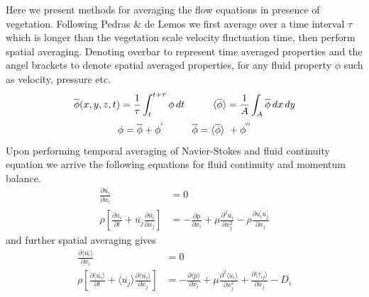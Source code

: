 \documentclass[12pt]{report}   %
\renewcommand{\bar}{\overline}
\begin{document}

Here we present methods for averaging the flow equations in presence of vegetation. Following Pedras $\&$ de Lemos \cite{Pedras00} we first average over a time interval $\tau$ which is longer than the vegetation scale velocity fluctuation time, then perform spatial averaging. Denoting 
overbar to represent time averaged properties and the angel brackets to denote spatial averaged properties, for any fluid property $\phi$ such as velocity, pressure etc.
  \[ \bar{\phi}(x,y,z,t) = \frac{1}{\tau} \int_{t}^{t+\tau} \phi  \, dt \hspace{1.cm}  \langle \bar{\phi}\rangle = \frac{1}{A} \int_{A} \bar{\phi}  \,dx \,dy \]
  \[\phi = \bar{\phi}+\phi^{'} \hspace{1.cm}  \bar{\phi} = \langle \bar{\phi} \rangle \ +\phi^{''} \]
 Upon performing temporal averaging of Navier-Stokes and fluid continuity equation we arrive the following equations for fluid continuity and momentum balance.
 \begin{equation}
 \begin{split}
 \frac{\partial \bar{u_i} }{\partial x_i} &=0 \\
 \rho \left[ \frac{\partial  \overline{u_i}  }{\partial t}+  \overline{u_j}  \frac{\partial  \overline{u_i} }{\partial x_j} \right ] &= -\frac{\partial  \bar{p}   }{\partial x_i} + \mu \frac{\partial^2  \overline{u_i}  }{\partial x_j^2} - \rho \frac{\partial  \overline { u_i^{'} u_j^{'} }  }{\partial x_j} 
 \end{split}
 \end{equation}
 and further spatial averaging gives
  \begin{equation}\label{averaged_eq}
  \begin{split}
  \frac{\partial \langle \bar{u_i} \rangle}{\partial x_i}&=0 \\
 \rho \left[ \frac{\partial \langle \overline{u_i} \rangle }{\partial t}+ \langle \overline{u_j} \rangle \frac{\partial \langle \bar{u_i} \rangle}{\partial x_j} \right ] &= -\frac{\partial \langle \bar{p} \rangle  }{\partial x_i} + \mu \frac{\partial^2 \langle \bar{u_i} \rangle }{\partial         x_j^2} + \frac{\partial \langle \bar{\tau_{ij}} \rangle }{\partial x_j} -D_i
 \end{split}
 \end{equation}
\end{document}
